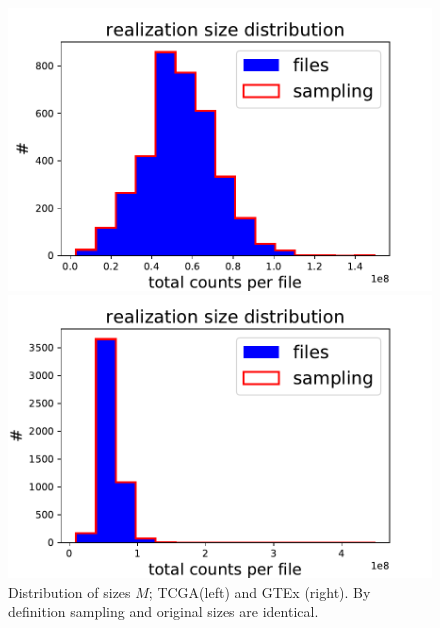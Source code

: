 \begin{figure}[htb!]
\begin{minipage}{0.5\textwidth}
    \centering
    \includegraphics[width=0.95\linewidth]{pictures/structure/tcga/sizeDistr_null.pdf}
\end{minipage}
\hspace{2mm}
\begin{minipage}{0.5\textwidth}
    \centering
    \includegraphics[width=0.95\linewidth]{pictures/structure/gtex/sizeDistr_null.pdf}
    \end{minipage}
\caption{Distribution of sizes $M$; TCGA(left) and GTEx (right). By definition sampling and original sizes are identical.}
    \label{fig:structure/sizeDistr_null}
\end{figure}

